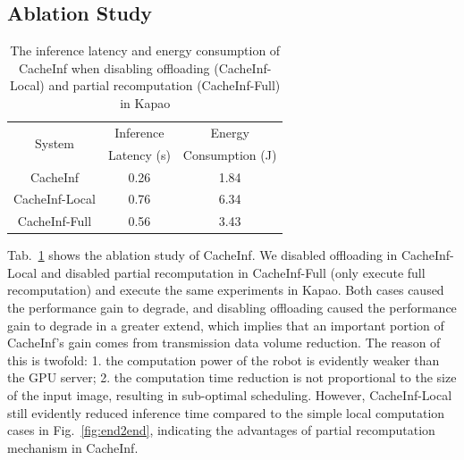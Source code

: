 \subsection{Ablation Study}
\begin{table}[h!]
    \begin{tabular}{c|c|c}
        \toprule
        \multirow{2}{*}{System} & Inference & Energy\\
         & Latency (s) & Consumption (J)\\
        \midrule
        CacheInf & 0.26 & 1.84 \\ 
        CacheInf-Local & 0.76 & 6.34 \\ 
        CacheInf-Full & 0.56  & 3.43 \\ 
        \bottomrule

    \end{tabular}
    \caption[sample rates]{The inference latency and energy consumption of CacheInf when disabling offloading (CacheInf-Local) and partial recomputation (CacheInf-Full) in Kapao}
    \label{abl}
\end{table}
Tab.~\ref{abl} shows the ablation study of CacheInf.
We disabled offloading in CacheInf-Local and disabled partial recomputation in CacheInf-Full (only execute full recomputation) and execute the same experiments in Kapao.
Both cases caused the performance gain to degrade, and disabling offloading caused the performance gain to degrade in a greater extend, which implies that an important portion of CacheInf's gain comes from transmission data volume reduction.
The reason of this is twofold: 1. the computation power of the robot is evidently weaker than the GPU server; 2. the computation time reduction is not proportional to the size of the input image, resulting in sub-optimal scheduling.
However, CacheInf-Local still evidently reduced inference time compared to the simple local computation cases in Fig.~\ref{fig:end2end}, indicating the advantages of partial recomputation mechanism in CacheInf.

    

